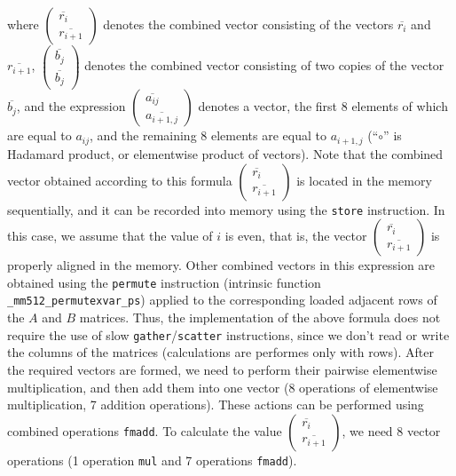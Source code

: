 \documentclass[
11pt,%
tightenlines,%
twoside,%
onecolumn,%
nofloats,%
nobibnotes,%
nofootinbib,%
superscriptaddress,%
noshowpacs,%
centertags]%
{revtex4}
\begin{document}
where $\begin{pmatrix} \overline{r_i} \\ \overline{r_{i+1}} \end{pmatrix}$ denotes the combined vector consisting of the vectors $\overline{r_i}$ and $\overline{r_{i+1}}$, $\begin{pmatrix} \overline{b_j} \\ \overline{b_j} \end{pmatrix}$ denotes the combined vector consisting of two copies of the vector $\overline{b_j}$, and the expression $\begin{pmatrix} \overline{a_{ij}} \\ \overline{a_{i+1,j}} \end{pmatrix}$ denotes a vector, the first 8 elements of which are equal to $a_{ij}$, and the remaining 8 elements are equal to $a_{i+1,j}$ (``$\circ$'' is Hadamard product, or elementwise product of vectors).
Note that the combined vector obtained according to this formula $\begin{pmatrix} \overline{r_i} \\ \overline{r_{i+1}} \end{pmatrix}$ is located in the memory sequentially, and it can be recorded into memory using the \texttt{store} instruction.
In this case, we assume that the value of $i$ is even, that is, the vector $\begin{pmatrix} \overline{r_i} \\ \overline{r_{i+1}} \end{pmatrix}$ is properly aligned in the memory.
Other combined vectors in this expression are obtained using the \texttt{permute} instruction (intrinsic function \texttt{\_mm512\_permutexvar\_ps}) applied to the corresponding loaded adjacent rows of the $A$ and $B$ matrices.
Thus, the implementation of the above formula does not require the use of slow \texttt{gather}/\texttt{scatter} instructions, since we don't read or write the columns of the matrices (calculations are performes only with rows).
After the required vectors are formed, we need to perform their pairwise elementwise multiplication, and then add them into one vector (8 operations of elementwise multiplication, 7 addition operations).
These actions can be performed using combined operations \texttt{fmadd}.
To calculate the value $\begin{pmatrix} \overline{r_i} \\ \overline{r_{i+1}} \end{pmatrix}$, we need 8 vector operations (1 operation \texttt{mul} and 7 operations \texttt{fmadd}).
\end{document}
